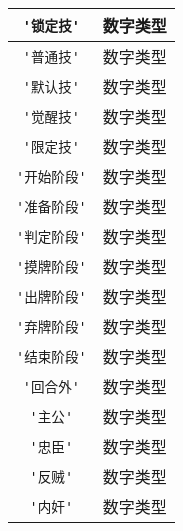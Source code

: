 \begin{center}
\begin{longtable}{|c|c|}
\hline \verb|'锁定技'| & 数字类型 \\
\hline \verb|'普通技'| & 数字类型 \\
\hline \verb|'默认技'| & 数字类型 \\
\hline \verb|'觉醒技'| & 数字类型 \\
\hline \verb|'限定技'| & 数字类型 \\

\hline \verb|'开始阶段'| & 数字类型 \\
\hline \verb|'准备阶段'| & 数字类型 \\
\hline \verb|'判定阶段'| & 数字类型 \\
\hline \verb|'摸牌阶段'| & 数字类型 \\
\hline \verb|'出牌阶段'| & 数字类型 \\
\hline \verb|'弃牌阶段'| & 数字类型 \\
\hline \verb|'结束阶段'| & 数字类型 \\
\hline \verb|'回合外'| & 数字类型 \\

\hline \verb|'主公'| & 数字类型 \\
\hline \verb|'忠臣'| & 数字类型 \\
\hline \verb|'反贼'| & 数字类型 \\
\hline \verb|'内奸'| & 数字类型 \\


\end{longtable}
\end{center}
